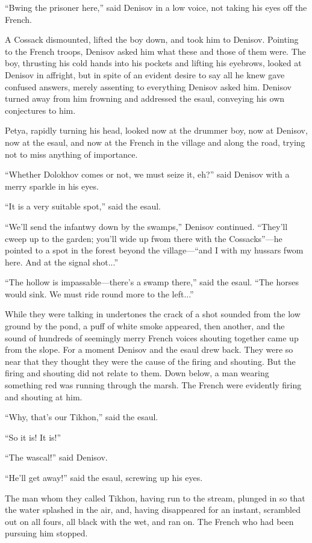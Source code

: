 ``Bwing the prisoner here,'' said Denisov in a low voice, not
taking his eyes off the French.

A Cossack dismounted, lifted the boy down, and took him to
Denisov.  Pointing to the French troops, Denisov asked him what
these and those of them were. The boy, thrusting his cold hands
into his pockets and lifting his eyebrows, looked at Denisov in
affright, but in spite of an evident desire to say all he knew
gave confused answers, merely assenting to everything Denisov
asked him. Denisov turned away from him frowning and addressed
the esaul, conveying his own conjectures to him.

Petya, rapidly turning his head, looked now at the drummer boy,
now at Denisov, now at the esaul, and now at the French in the
village and along the road, trying not to miss anything of
importance.

``Whether Dolokhov comes or not, we must seize it, eh?'' said
Denisov with a merry sparkle in his eyes.

``It is a very suitable spot,'' said the esaul.

``We'll send the infantwy down by the swamps,'' Denisov
continued.  ``They'll cweep up to the garden; you'll wide up fwom
there with the Cossacks''---he pointed to a spot in the forest
beyond the village---``and I with my hussars fwom here. And at
the signal shot...''

``The hollow is impassable---there's a swamp there,'' said the
esaul. ``The horses would sink. We must ride round more to the
left...''

While they were talking in undertones the crack of a shot sounded
from the low ground by the pond, a puff of white smoke appeared,
then another, and the sound of hundreds of seemingly merry French
voices shouting together came up from the slope. For a moment
Denisov and the esaul drew back. They were so near that they
thought they were the cause of the firing and shouting. But the
firing and shouting did not relate to them. Down below, a man
wearing something red was running through the marsh. The French
were evidently firing and shouting at him.

``Why, that's our Tikhon,'' said the esaul.

``So it is! It is!''

``The wascal!'' said Denisov.

``He'll get away!'' said the esaul, screwing up his eyes.

The man whom they called Tikhon, having run to the stream,
plunged in so that the water splashed in the air, and, having
disappeared for an instant, scrambled out on all fours, all black
with the wet, and ran on.  The French who had been pursuing him
stopped.

